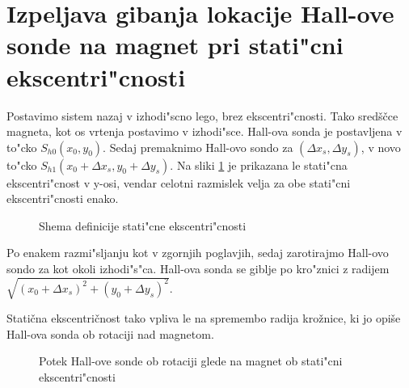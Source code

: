 \section{Izpeljava gibanja lokacije Hall-ove sonde na magnet pri stati"cni ekscentri"cnosti}


Postavimo sistem nazaj v izhodi"scno lego, brez ekscentri"cnosti. Tako sredščce magneta, kot os vrtenja postavimo v izhodi"sce. Hall-ova sonda je postavljena v to"cko $S_{h0}(x_0,y_0)$. Sedaj premaknimo Hall-ovo sondo za $(\Delta x_s, \Delta y_s)$, v novo to"cko $S_{h1}(x_0+\Delta x_s, y_0+\Delta y_s)$. Na sliki \ref{fig:def_sta_eks} je prikazana le stati"cna ekscentri"cnost v y-osi, vendar celotni razmislek velja za obe stati"cni ekscentri"cnosti enako.


\begin{figure}[h!]
	\centering
	\caption{Shema definicije stati"cne ekscentri"cnosti}
	\label{fig:def_sta_eks}
\end{figure}

Po enakem razmi"sljanju kot v zgornjih poglavjih, sedaj zarotirajmo Hall-ovo sondo za kot \kol{-\theta} okoli izhodi"s"ca. Hall-ova sonda se giblje po kro"znici z radijem $\sqrt{(x_0+\Delta x_s)^2+(y_0+\Delta y_s)^2}$.

Statična ekscentričnost tako vpliva le na spremembo radija krožnice, ki jo opiše Hall-ova sonda ob rotaciji nad magnetom.

\begin{figure}[h!]
	\centering
	\caption{Potek Hall-ove sonde ob rotaciji glede na magnet ob stati"cni ekscentri"cnosti}
	\label{fig:def_sta_eks_stat}
\end{figure}


